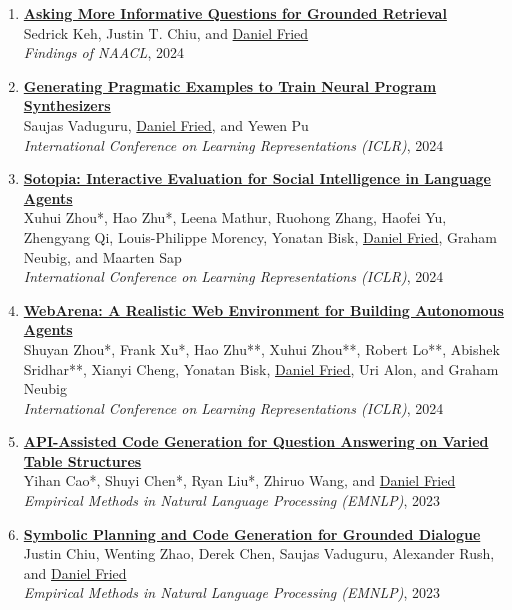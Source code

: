 \begin{enumerate}[leftmargin=-1mm,partopsep=0pt]
\item \href{https://arxiv.org/abs/2311.08584}{\textbf{Asking More Informative Questions for Grounded Retrieval}} \\
  Sedrick Keh, Justin T. Chiu, and \underline{Daniel Fried}\\
  \emph{Findings of NAACL}, 2024

\item \href{https://arxiv.org/abs/2311.05740}{\textbf{Generating Pragmatic Examples to Train Neural Program Synthesizers}} \\
  Saujas Vaduguru, \underline{Daniel Fried}, and Yewen Pu\\
  \emph{International Conference on Learning Representations (ICLR)}, 2024

\item \href{http://arxiv.org/abs/2310.11667}{\textbf{Sotopia: Interactive Evaluation for Social Intelligence in Language Agents}} \\
  Xuhui Zhou*, Hao Zhu*, Leena Mathur, Ruohong Zhang, Haofei Yu, Zhengyang Qi, Louis-Philippe Morency, Yonatan Bisk, \underline{Daniel Fried}, Graham Neubig, and Maarten Sap\\
  \emph{International Conference on Learning Representations (ICLR)}, 2024

\item \href{https://arxiv.org/abs/2307.13854}{\textbf{WebArena: A Realistic Web Environment for Building Autonomous Agents}} \\
  Shuyan Zhou*, Frank Xu*, Hao Zhu**, Xuhui Zhou**, Robert Lo**, Abishek Sridhar**, Xianyi Cheng, Yonatan Bisk, \underline{Daniel Fried}, Uri Alon, and Graham Neubig\\
  \emph{International Conference on Learning Representations (ICLR)}, 2024

\item \href{https://arxiv.org/abs/2310.14687}{\textbf{API-Assisted Code Generation for Question Answering on Varied Table Structures}} \\
  Yihan Cao*, Shuyi Chen*, Ryan Liu*, Zhiruo Wang, and \underline{Daniel Fried}\\
  \emph{Empirical Methods in Natural Language Processing (EMNLP)}, 2023

\item \href{https://arxiv.org/abs/2310.17140}{\textbf{Symbolic Planning and Code Generation for Grounded Dialogue }} \\
  Justin Chiu, Wenting Zhao, Derek Chen, Saujas Vaduguru, Alexander Rush, and \underline{Daniel Fried}\\
  \emph{Empirical Methods in Natural Language Processing (EMNLP)}, 2023


\end{enumerate}
